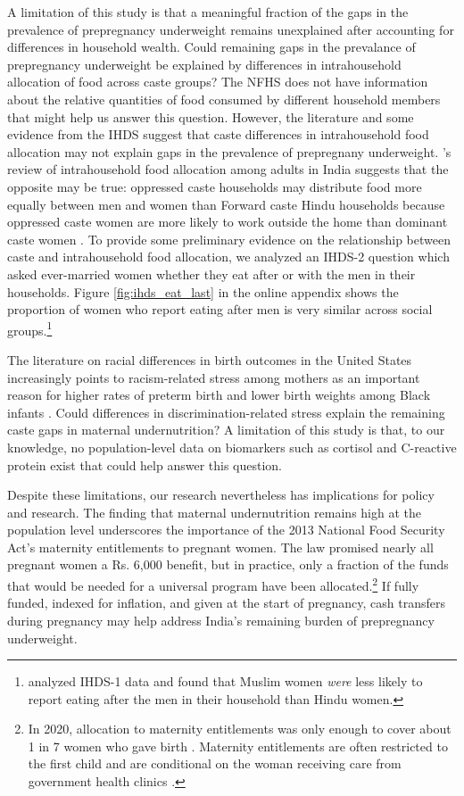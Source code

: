 \documentclass[12pt]{article}
\begin{document}
A limitation of this study is that a meaningful fraction of the gaps in the prevalence of prepregnancy underweight remains unexplained after accounting for differences in household wealth.  Could remaining gaps in the prevalance of prepregnancy underweight be explained by differences in intrahousehold allocation of food across caste groups? The NFHS does not have information about the relative quantities of food consumed by different household members that might help us answer this question.  However, the literature and some evidence from the IHDS suggest that caste differences in intrahousehold food allocation may not explain gaps in the prevalence of prepregnany underweight.  \cite{harris2017determinants}'s review  of intrahousehold food allocation among adults in India suggests that the opposite may be true: oppressed caste households may distribute food more equally between men and women than Forward caste Hindu households because oppressed caste women are more likely to work outside the home than dominant caste women \citep{chakrabarty1996gender, eswaran2013status}.  To provide some preliminary evidence on the relationship between caste and intrahousehold food allocation, we analyzed an IHDS-2 question which asked ever-married women whether they eat after or with the men in their households.  Figure \ref{fig:ihds_eat_last} in the online appendix shows the proportion of women who report eating after men is very similar across social groups.\footnote{\cite{desai2014muslim} analyzed IHDS-1 data and found that Muslim women \emph{were} less likely to report eating after the men in their household than Hindu women.}  

The literature on racial differences in birth outcomes in the United States increasingly points to racism-related stress among mothers as an important reason for higher rates of preterm birth and lower birth weights among Black infants \citep{hogue2005stress, sosnaud2021cross}. Could differences in discrimination-related stress explain the remaining caste gaps in maternal undernutrition? A limitation of this study is that, to our knowledge, no population-level data on biomarkers such as cortisol and C-reactive protein exist that could help answer this question. 

Despite these limitations, our research nevertheless has implications for policy and research.  The finding that maternal undernutrition remains high at the population level underscores the importance of the 2013 National Food Security Act's maternity entitlements to pregnant women. The law promised nearly all pregnant women a Rs. 6,000 benefit, but in practice, only a fraction of the funds that would be needed for a universal program have been allocated.\footnote{In 2020, allocation to maternity entitlements was only enough to cover about 1 in 7 women who gave birth \cite{dreze2021derailed}.  Maternity entitlements are often restricted to the first child and are conditional on the woman receiving care from government health clinics \citep{kalra2020birth}.}  If fully funded, indexed for inflation, and given at the start of pregnancy, cash transfers during pregnancy may help address India's remaining burden of prepregnancy underweight. 
\end{document}
